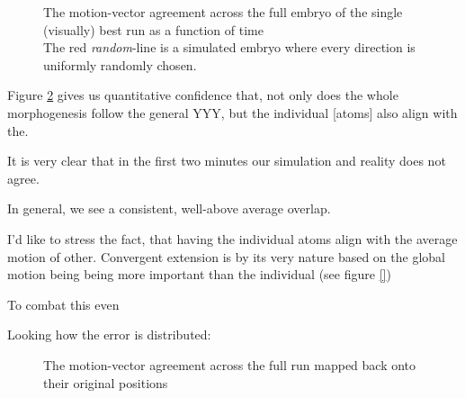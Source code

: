 \begin{figure}[H]
    \centering
    \caption{The motion-vector agreement across the full embryo of the single (visually) best run as a function of time\\
    The red \textit{random}-line is a simulated embryo where every direction is uniformly randomly chosen. }
    \label{fig:motionAgreement}
\end{figure}

Figure \ref{fig:motionAgreement} gives us quantitative confidence that, not only does the whole morphogenesis follow the general YYY, but the individual [atoms] also align with the.

It is very clear that in the first two minutes our simulation and reality does not agree. 



In general, we see a consistent, well-above average overlap. 

I'd like to stress the fact, that having the individual atoms align with the average motion of other. Convergent extension is by its very nature based on the global motion being being more important than the individual (see figure \ref{}) 

To combat this even

Looking how the error is distributed:
\begin{figure}[H]
    \centering
    \caption{The motion-vector agreement across the full run mapped back onto their original positions }
    \label{fig:motionAgreement}
\end{figure}


